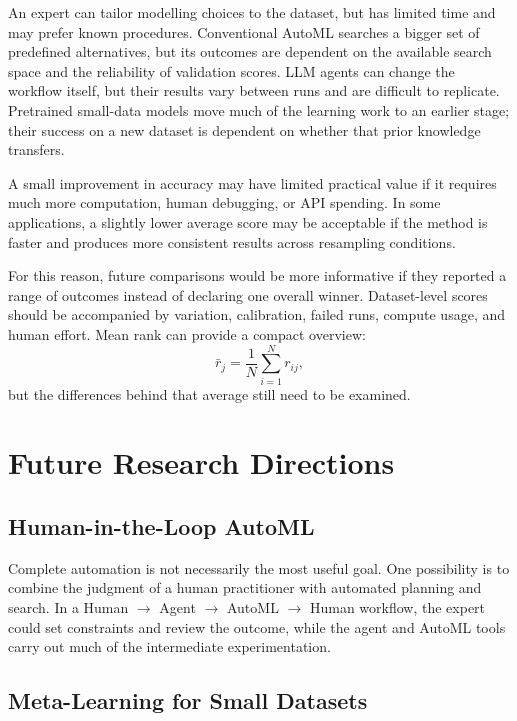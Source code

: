 \documentclass[acmsmall,screen]{acmart}
\begin{document}
An expert can tailor modelling choices to the dataset, but has limited time and may prefer known procedures. Conventional AutoML searches a bigger set of predefined alternatives, but its outcomes are dependent on the available search space and the reliability of validation scores. LLM agents can change the workflow itself, but their results vary between runs and are difficult to replicate. Pretrained small-data models move much of the learning work to an earlier stage; their success on a new dataset is dependent on whether that prior knowledge transfers.

A small improvement in accuracy may have limited practical value if it requires much more computation, human debugging, or API spending. In some applications, a slightly lower average score may be acceptable if the method is faster and produces more consistent results across resampling conditions.

For this reason, future comparisons would be more informative if they reported a range of outcomes instead of declaring one overall winner. Dataset-level scores should be accompanied by variation, calibration, failed runs, compute usage, and human effort. Mean rank can provide a compact overview:
\begin{equation}
\bar r_j=\frac{1}{N}\sum_{i=1}^{N}r_{ij},
\label{eq:rank}
\end{equation}
but the differences behind that average still need to be examined.

\section{Future Research Directions}\label{sec:future}

\subsection{Human-in-the-Loop AutoML}

Complete automation is not necessarily the most useful goal. One possibility is to combine the judgment of a human practitioner with automated planning and search. In a Human $\rightarrow$ Agent $\rightarrow$ AutoML $\rightarrow$ Human workflow, the expert could set constraints and review the outcome, while the agent and AutoML tools carry out much of the intermediate experimentation.

\subsection{Meta-Learning for Small Datasets}
\end{document}
